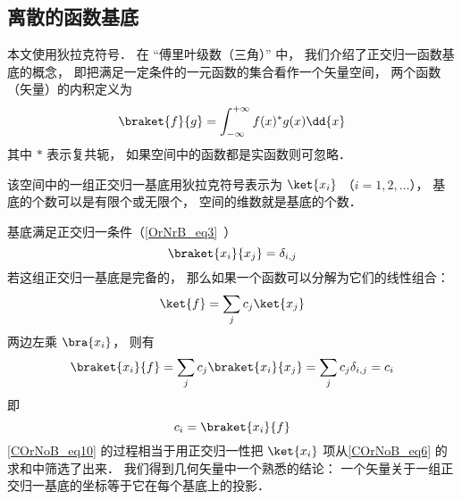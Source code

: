 

\subsection{离散的函数基底}
本文使用狄拉克符号． 在 “傅里叶级数（三角）” 中， 我们介绍了正交归一函数基底的概念， 即把满足一定条件的一元函数的集合看作一个矢量空间， 两个函数（矢量）的内积定义为
\begin{equation}
\braket{f}{g} = \int_{-\infty}^{+\infty} f(x)^* g(x) \dd{x}
\end{equation}
其中 $*$ 表示复共轭， 如果空间中的函数都是实函数则可忽略．

该空间中的一组正交归一基底用狄拉克符号表示为 $\ket{x_i}$ （$i = 1, 2,\dots$）， 基底的个数可以是有限个或无限个， 空间的维数就是基底的个数．

基底满足正交归一条件（\autoref{OrNrB_eq3}~）
\begin{equation}\label{COrNoB_eq2}
\braket{x_i}{x_j} = \delta_{i,j}
\end{equation}
若这组正交归一基底是完备的， 那么如果一个函数可以分解为它们的线性组合：
\begin{equation}\label{COrNoB_eq6}
\ket{f} = \sum_j c_j\ket{x_j}
\end{equation}
两边左乘 $\bra{x_i}$， 则有
\begin{equation}\label{COrNoB_eq10}
\braket{x_i}{f} = \sum_j c_j\braket{x_i}{x_j} = \sum_j c_j \delta_{i,j} = c_i
\end{equation}
即
\begin{equation}\label{COrNoB_eq5}
c_i = \braket{x_i}{f}
\end{equation}
\autoref{COrNoB_eq10} 的过程相当于用正交归一性把 $\ket{x_i}$ 项从\autoref{COrNoB_eq6} 的求和中筛选了出来． 我们得到几何矢量中一个熟悉的结论： 一个矢量关于一组正交归一基底的坐标等于它在每个基底上的投影．

